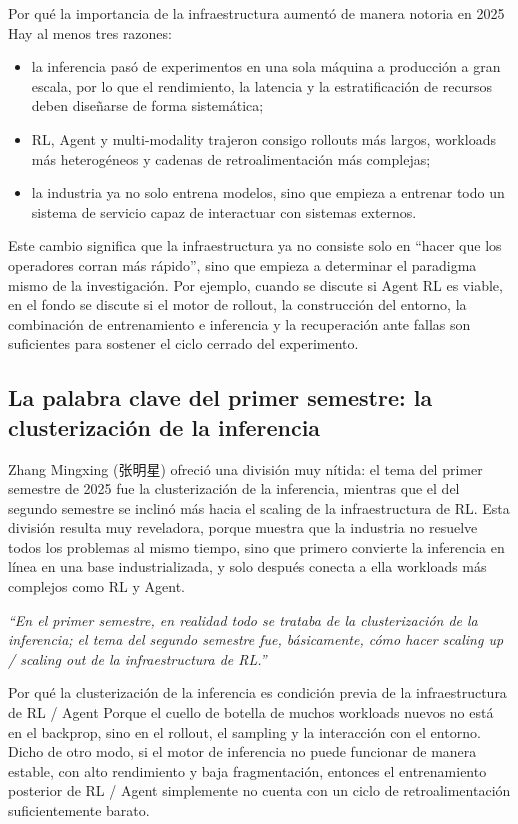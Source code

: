 \documentclass[a4paper]{article}
\begin{document}
\begin{importantbox}{Por qué la importancia de la infraestructura aumentó de manera notoria en 2025}
Hay al menos tres razones:
\begin{itemize}
  \item la inferencia pasó de experimentos en una sola máquina a producción a gran escala, por lo que el rendimiento, la latencia y la estratificación de recursos deben diseñarse de forma sistemática;
  \item RL, Agent y multi-modality trajeron consigo rollouts más largos, workloads más heterogéneos y cadenas de retroalimentación más complejas;
  \item la industria ya no solo entrena modelos, sino que empieza a entrenar todo un sistema de servicio capaz de interactuar con sistemas externos.
\end{itemize}
\end{importantbox}

Este cambio significa que la infraestructura ya no consiste solo en ``hacer que los operadores corran más rápido'', sino que empieza a determinar el paradigma mismo de la investigación. Por ejemplo, cuando se discute si Agent RL es viable, en el fondo se discute si el motor de rollout, la construcción del entorno, la combinación de entrenamiento e inferencia y la recuperación ante fallas son suficientes para sostener el ciclo cerrado del experimento.

\subsection{La palabra clave del primer semestre: la clusterización de la inferencia}
Zhang Mingxing (张明星) ofreció una división muy nítida: el tema del primer semestre de 2025 fue la clusterización de la inferencia, mientras que el del segundo semestre se inclinó más hacia el scaling de la infraestructura de RL. Esta división resulta muy reveladora, porque muestra que la industria no resuelve todos los problemas al mismo tiempo, sino que primero convierte la inferencia en línea en una base industrializada, y solo después conecta a ella workloads más complejos como RL y Agent.

\textit{``En el primer semestre, en realidad todo se trataba de la clusterización de la inferencia; el tema del segundo semestre fue, básicamente, cómo hacer scaling up / scaling out de la infraestructura de RL.''}

\begin{knowledgebox}{Por qué la clusterización de la inferencia es condición previa de la infraestructura de RL / Agent}
Porque el cuello de botella de muchos workloads nuevos no está en el backprop, sino en el rollout, el sampling y la interacción con el entorno. Dicho de otro modo, si el motor de inferencia no puede funcionar de manera estable, con alto rendimiento y baja fragmentación, entonces el entrenamiento posterior de RL / Agent simplemente no cuenta con un ciclo de retroalimentación suficientemente barato.
\end{knowledgebox}
\end{document}
